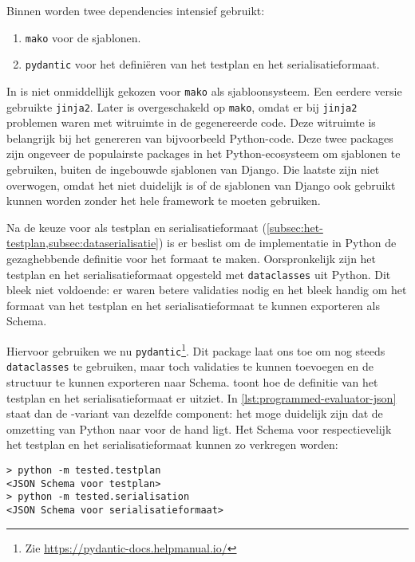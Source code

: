 Binnen \tested{} worden twee dependencies intensief gebruikt:

\begin{enumerate}
    \item \texttt{mako} voor de sjablonen.
    \item \texttt{pydantic} voor het definiëren van het testplan en het serialisatieformaat.
\end{enumerate}

In \tested{} is niet onmiddellijk gekozen voor \texttt{mako} als sjabloonsysteem.
Een eerdere versie gebruikte \texttt{jinja2}.
Later is overgeschakeld op \texttt{mako}, omdat er bij \texttt{jinja2} problemen waren met witruimte in de gegenereerde code.
Deze witruimte is belangrijk bij het genereren van bijvoorbeeld Python-code.
Deze twee packages zijn ongeveer de populairste packages in het Python-ecosysteem om sjablonen te gebruiken, buiten de ingebouwde sjablonen van Django.
Die laatste zijn niet overwogen, omdat het niet duidelijk is of de sjablonen van Django ook gebruikt kunnen worden zonder het hele framework te moeten gebruiken.

Na de keuze voor  als testplan en serialisatieformaat (\cref{subsec:het-testplan,subsec:dataserialisatie}) is er beslist om de implementatie in Python de gezaghebbende definitie voor het formaat te maken.
Oorspronkelijk zijn het testplan en het serialisatieformaat opgesteld met \texttt{dataclasses} uit Python.
Dit bleek niet voldoende: er waren betere validaties nodig en het bleek handig om het formaat van het testplan en het serialisatieformaat te kunnen exporteren als  Schema.

Hiervoor gebruiken we nu \texttt{pydantic}\footnote{Zie \url{https://pydantic-docs.helpmanual.io/}}.
Dit package laat ons toe om nog steeds \texttt{dataclasses} te gebruiken, maar toch validaties te kunnen toevoegen en de structuur te kunnen exporteren naar  Schema.
 toont hoe de definitie van het testplan en het serialisatieformaat er uitziet.
In \cref{lst:programmed-evaluator-json} staat dan de -variant van dezelfde component: het moge duidelijk zijn dat de omzetting van Python naar  voor de hand ligt.
Het  Schema voor respectievelijk het testplan en het serialisatieformaat kunnen zo verkregen worden:

\begin{verbatim}
> python -m tested.testplan
<JSON Schema voor testplan>
> python -m tested.serialisation
<JSON Schema voor serialisatieformaat>
\end{verbatim}

